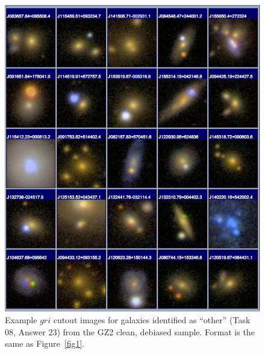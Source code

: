 \documentclass[useAMS,usenatbib]{mn2e}
\begin{document}
\newpage
\clearpage
\begin{figure}
\includegraphics[angle=0,width=7.0in]{figures/gallery/other.png}
\caption{Example $gri$ cutout images for galaxies identified as ``other'' (Task 08, Answer 23) from the GZ2 clean, debiased sample. Format is the same as Figure~\ref{fig1}.}
\end{figure}
\end{document}

